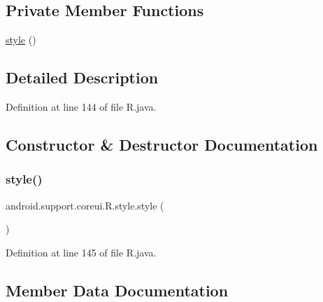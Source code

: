 \subsection*{Private Member Functions}
\begin{DoxyCompactItemize}
\item 
\mbox{\hyperlink{classandroid_1_1support_1_1coreui_1_1_r_1_1style_a19e3484370b486762bc16750168677b5}{style}} ()
\end{DoxyCompactItemize}


\subsection{Detailed Description}


Definition at line 144 of file R.\+java.



\subsection{Constructor \& Destructor Documentation}
\mbox{\label{classandroid_1_1support_1_1coreui_1_1_r_1_1style_a19e3484370b486762bc16750168677b5}} 
\subsubsection{\texorpdfstring{style()}{style()}}
{\footnotesize\ttfamily android.\+support.\+coreui.\+R.\+style.\+style (\begin{DoxyParamCaption}{ }\end{DoxyParamCaption})\hspace{0.3cm}{\ttfamily [private]}}



Definition at line 145 of file R.\+java.


\begin{DoxyCode}{0}

\end{DoxyCode}


\subsection{Member Data Documentation}
\mbox{\label{classandroid_1_1support_1_1coreui_1_1_r_1_1style_a0c6b96d4834665690ae4c899c1a719b6}} 
